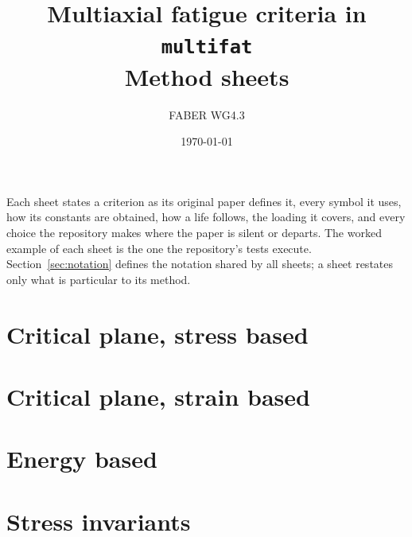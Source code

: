 \documentclass[10pt,a4paper]{article}
\title{Multiaxial fatigue criteria in \texttt{multifat}\\[2pt]\large Method sheets}
\author{FABER WG4.3}
\date{\today}
\numberwithin{equation}{section}
\begin{document}
\maketitle

\noindent Each sheet states a criterion as its original paper defines it, every symbol it uses, how
its constants are obtained, how a life follows, the loading it covers, and every choice the
repository makes where the paper is silent or departs. The worked example of each sheet is the
one the repository's tests execute. Section~\ref{sec:notation} defines the notation shared by all
sheets; a sheet restates only what is particular to its method.

\tableofcontents



\part*{Critical plane, stress based}













\part*{Critical plane, strain based}






\part*{Energy based}











\part*{Stress invariants}










\end{document}
